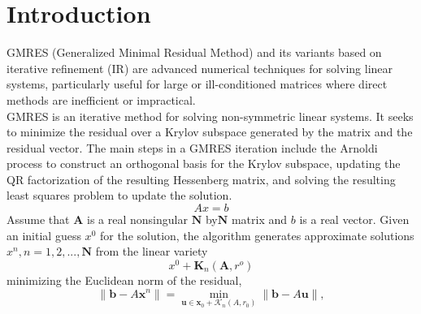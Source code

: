 
\section{Introduction}
GMRES (Generalized Minimal Residual Method) and its variants based on iterative refinement (IR) are advanced numerical techniques for solving linear systems, particularly useful for large or ill-conditioned matrices where direct methods are inefficient or impractical. \\
GMRES is an iterative method for solving non-symmetric linear systems. It seeks to minimize the residual over a Krylov subspace generated by the matrix and the residual vector. The main steps in a GMRES iteration include the Arnoldi process to construct an orthogonal basis for the Krylov subspace, updating the QR factorization of the resulting Hessenberg matrix, and solving the resulting least squares problem to update the solution\cite{Homer1988}.\\
\begin{equation}
    Ax=b
\end{equation}
Assume that $\textbf{A}$ is a real nonsingular $\textbf{N}$ by$\textbf{N}$ matrix and $b$ is a real vector. Given an initial guess $x^0$ for the solution, the algorithm generates approximate solutions $x^n,n=1,2,...,\textbf{N}$ from the linear variety
\begin{equation}
    x^0+\textbf{K}_n(\textbf{A},r^o)
\end{equation}
minimizing the Euclidean norm of the residual,
\begin{equation}
    \| \mathbf{b} - A\mathbf{x}^n \| = \min_{\mathbf{u} \in \mathbf{x}_0 + \mathcal{K}_n(A,r_0)} \| \mathbf{b} - A\mathbf{u} \|,
\end{equation}

